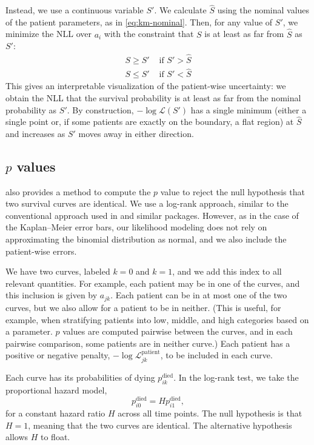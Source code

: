 \documentclass[article]{jss}
\newcommand{\KM}{Kaplan--Meier} %
\begin{document}
Instead, we use a continuous variable \(S'\).  We calculate \(\hat{S}\) using the nominal values of the patient parameters, as in \cref{eq:km-nominal}.  Then, for any value of \(S'\), we minimize the NLL over \(a_i\) with the constraint that \(S\) is at least as far from \(\hat{S}\) as \(S'\):
\begin{align}
S \ge S' & \text{ if } S' > \hat{S} \\
S \le S' & \text{ if } S' < \hat{S}
\end{align}
This gives an interpretable visualization of the patient-wise uncertainty: we obtain the NLL that the survival probability is at least as far from the nominal probability as \(S'\).  By construction, \(-\log\mathcal{L}(S')\) has a single minimum (either a single point or, if some patients are exactly on the boundary, a flat region) at \(\hat{S}\) and increases as \(S'\) moves away in either direction.

\subsection[p values]{\(p\) values}

 also provides a method to compute the \(p\) value to reject the null hypothesis that two survival curves are identical.  We use a log-rank approach, similar to the conventional approach used in  and similar packages.  However, as in the case of the \KM{} error bars, our likelihood modeling does not rely on approximating the binomial distribution as normal, and we also include the patient-wise errors.

We have two curves, labeled \(k=0\) and \(k=1\), and we add this index to all relevant quantities.  For example, each patient may be in one of the curves, and this inclusion is given by \(a_{jk}\).  Each patient can be in at most one of the two curves, but we also allow for a patient to be in neither.  (This is useful, for example, when stratifying patients into low, middle, and high categories based on a parameter\@.  \(p\) values are computed pairwise between the curves, and in each pairwise comparison, some patients are in neither curve.)  Each patient has a positive or negative penalty, \(-\log\mathcal{L}_{jk}^\text{patient}\), to be included in each curve.

Each curve has its probabilities of dying \(p^\text{died}_{ik}\).  In the log-rank test, we take the proportional hazard model,
\begin{equation}
p^\text{died}_{i0} = H p^\text{died}_{i1},
\label{eq:logrank-hazard}
\end{equation}
for a constant hazard ratio \(H\) across all time points.  The null hypothesis is that \(H=1\), meaning that the two curves are identical.  The alternative hypothesis allows \(H\) to float.
\end{document}
